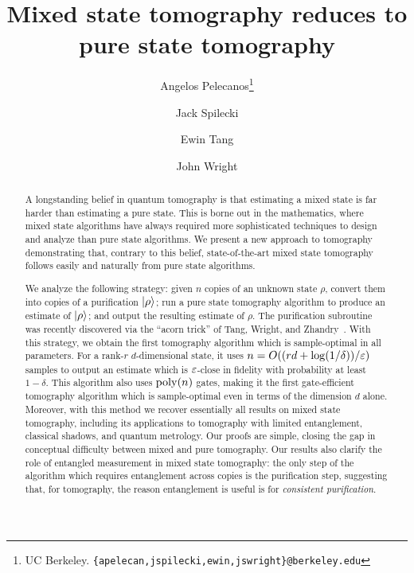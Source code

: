 \documentclass{article}
\title{Mixed state tomography reduces to pure state tomography}
\author{Angelos Pelecanos\thanks{UC Berkeley. \texttt{\{apelecan,jspilecki,ewin,jswright\}@berkeley.edu}}  \and Jack Spilecki\footnotemark[1] \and Ewin Tang\footnotemark[1]\and John Wright\footnotemark[1]}
\date{}
\begin{document}
\maketitle

\begin{abstract}
    A longstanding belief in quantum tomography is that estimating a mixed state is far harder than estimating a pure state.
    This is borne out in the mathematics, where mixed state algorithms have always required more sophisticated techniques to design and analyze than pure state algorithms.
    We present a new approach to tomography demonstrating that, contrary to this belief, state-of-the-art mixed state tomography follows easily and naturally from pure state algorithms.
    
    We analyze the following strategy: given $n$ copies of an unknown state $\rho$, convert them into copies of a purification $\ket{\rho}$; run a pure state tomography algorithm to produce an estimate of $\ket{\rho}$; and output the resulting estimate of $\rho$.
    The purification subroutine was recently discovered via the ``acorn trick'' of Tang, Wright, and Zhandry~\cite{TWZ25}.
    With this strategy, we obtain the first tomography algorithm which is sample-optimal in all parameters.
    For a rank-$r$ $d$-dimensional state, it uses $n = O((rd + \log(1/\delta))/\varepsilon)$ samples to output an estimate which is $\varepsilon$-close in fidelity with probability at least $1-\delta$.
    This algorithm also uses $\operatorname{poly}(n)$ gates, making it the first gate-efficient tomography algorithm which is sample-optimal even in terms of the dimension $d$ alone.
    Moreover, with this method we recover essentially all results on mixed state tomography, including its applications to tomography with limited entanglement, classical shadows, and quantum metrology.
    Our proofs are simple, closing the gap in conceptual difficulty between mixed and pure tomography.
    Our results also clarify the role of entangled measurement in mixed state tomography: the only step of the algorithm which requires entanglement across copies is the purification step, suggesting that, for tomography, the reason entanglement is useful is for \emph{consistent purification}.
\end{abstract}

\newpage

\hypersetup{linktocpage}
\tableofcontents
\thispagestyle{empty}

\newpage
\end{document}
